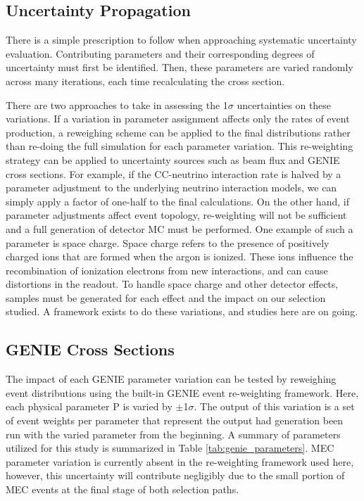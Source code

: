 \subsection{Uncertainty Propagation} 
There is a simple prescription to follow when approaching systematic uncertainty evaluation. Contributing parameters and their corresponding degrees of uncertainty must first be identified.  Then, these parameters are varied randomly across many iterations, each time recalculating the cross section.
\par There are two approaches to take in assessing the 1$\sigma$ uncertainties on these variations. If a variation in parameter assignment affects only the rates of event production, a reweighing scheme can be applied to the final distributions rather than re-doing the full simulation for each parameter variation.  This re-weighting strategy can be applied to uncertainty sources such as beam flux and GENIE cross sections.  For example, if the CC-neutrino interaction rate is halved by a parameter adjustment to the underlying neutrino interaction models, we can simply apply a factor of one-half to the final calculations.  On the other hand, if parameter adjustments affect event topology, re-weighting will not be sufficient and a full generation of detector MC must be performed. One example of such a parameter is space charge. Space charge refers to the presence of positively charged ions that are formed when the argon is ionized.  These ions influence the recombination of ionization electrons from new interactions, and can cause distortions in the readout. To handle space charge and other detector effects, samples must be generated for each effect and the impact on our selection studied. A framework exists to do these variations, and studies here are on going. %

\subsection{GENIE Cross Sections}
The impact of each GENIE parameter variation can be tested by reweighing event distributions using the built-in GENIE event re-weighting framework. Here, each physical parameter P is varied by $\pm$1$\sigma$. The output of this variation is a set of event weights per parameter that represent the output had generation been run with the varied parameter from the beginning. A summary of parameters utilized for this study is summarized in Table \ref{tab:genie_parameters}. MEC parameter variation is currently absent in the re-weighting framework used here, however, this uncertainty will contribute negligibly due to the small portion of MEC events at the final stage of both selection paths.

